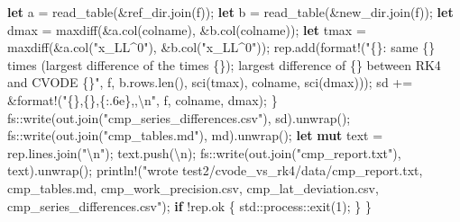 \documentclass[
  10pt,
]{article}
\newenvironment{Shaded}{}{}
\newcommand{\CharTok}[1]{\textcolor[rgb]{0.25,0.44,0.63}{#1}}
\newcommand{\ControlFlowTok}[1]{\textcolor[rgb]{0.00,0.44,0.13}{\textbf{#1}}}
\newcommand{\DecValTok}[1]{\textcolor[rgb]{0.25,0.63,0.44}{#1}}
\newcommand{\KeywordTok}[1]{\textcolor[rgb]{0.00,0.44,0.13}{\textbf{#1}}}
\newcommand{\NormalTok}[1]{#1}
\newcommand{\OperatorTok}[1]{\textcolor[rgb]{0.40,0.40,0.40}{#1}}
\newcommand{\PreprocessorTok}[1]{\textcolor[rgb]{0.74,0.48,0.00}{#1}}
\newcommand{\SpecialCharTok}[1]{\textcolor[rgb]{0.25,0.44,0.63}{#1}}
\newcommand{\StringTok}[1]{\textcolor[rgb]{0.25,0.44,0.63}{#1}}
\begin{document}
\begin{Shaded}
\begin{Highlighting}[]
        \KeywordTok{let}\NormalTok{ a }\OperatorTok{=}\NormalTok{ read\_table(}\OperatorTok{\&}\NormalTok{ref\_dir}\OperatorTok{.}\NormalTok{join(f))}\OperatorTok{;}
        \KeywordTok{let}\NormalTok{ b }\OperatorTok{=}\NormalTok{ read\_table(}\OperatorTok{\&}\NormalTok{new\_dir}\OperatorTok{.}\NormalTok{join(f))}\OperatorTok{;}
        \KeywordTok{let}\NormalTok{ dmax }\OperatorTok{=}\NormalTok{ maxdiff(}\OperatorTok{\&}\NormalTok{a}\OperatorTok{.}\NormalTok{col(colname)}\OperatorTok{,} \OperatorTok{\&}\NormalTok{b}\OperatorTok{.}\NormalTok{col(colname))}\OperatorTok{;}
        \KeywordTok{let}\NormalTok{ tmax }\OperatorTok{=}\NormalTok{ maxdiff(}\OperatorTok{\&}\NormalTok{a}\OperatorTok{.}\NormalTok{col(}\StringTok{"x\_LL\^{}0"}\NormalTok{)}\OperatorTok{,} \OperatorTok{\&}\NormalTok{b}\OperatorTok{.}\NormalTok{col(}\StringTok{"x\_LL\^{}0"}\NormalTok{))}\OperatorTok{;}
\NormalTok{        rep}\OperatorTok{.}\NormalTok{add(}\PreprocessorTok{format!}\NormalTok{(}\StringTok{"\{\}: same \{\} times (largest difference of the times \{\}); largest difference of \{\} between RK4 and CVODE \{\}"}\OperatorTok{,}\NormalTok{ f}\OperatorTok{,}\NormalTok{ b}\OperatorTok{.}\NormalTok{rows}\OperatorTok{.}\NormalTok{len()}\OperatorTok{,}\NormalTok{ sci(tmax)}\OperatorTok{,}\NormalTok{ colname}\OperatorTok{,}\NormalTok{ sci(dmax)))}\OperatorTok{;}
\NormalTok{        sd }\OperatorTok{+=} \OperatorTok{\&}\PreprocessorTok{format!}\NormalTok{(}\StringTok{"\{\},\{\},\{:.6e\},,}\SpecialCharTok{\textbackslash{}n}\StringTok{"}\OperatorTok{,}\NormalTok{ f}\OperatorTok{,}\NormalTok{ colname}\OperatorTok{,}\NormalTok{ dmax)}\OperatorTok{;}
    \OperatorTok{\}}
    \PreprocessorTok{fs::}\NormalTok{write(out}\OperatorTok{.}\NormalTok{join(}\StringTok{"cmp\_series\_differences.csv"}\NormalTok{)}\OperatorTok{,}\NormalTok{ sd)}\OperatorTok{.}\NormalTok{unwrap()}\OperatorTok{;}
    \PreprocessorTok{fs::}\NormalTok{write(out}\OperatorTok{.}\NormalTok{join(}\StringTok{"cmp\_tables.md"}\NormalTok{)}\OperatorTok{,}\NormalTok{ md)}\OperatorTok{.}\NormalTok{unwrap()}\OperatorTok{;}
    \KeywordTok{let} \KeywordTok{mut}\NormalTok{ text }\OperatorTok{=}\NormalTok{ rep}\OperatorTok{.}\NormalTok{lines}\OperatorTok{.}\NormalTok{join(}\StringTok{"}\SpecialCharTok{\textbackslash{}n}\StringTok{"}\NormalTok{)}\OperatorTok{;}
\NormalTok{    text}\OperatorTok{.}\NormalTok{push(}\CharTok{\textquotesingle{}}\SpecialCharTok{\textbackslash{}n}\CharTok{\textquotesingle{}}\NormalTok{)}\OperatorTok{;}
    \PreprocessorTok{fs::}\NormalTok{write(out}\OperatorTok{.}\NormalTok{join(}\StringTok{"cmp\_report.txt"}\NormalTok{)}\OperatorTok{,}\NormalTok{ text)}\OperatorTok{.}\NormalTok{unwrap()}\OperatorTok{;}
    \PreprocessorTok{println!}\NormalTok{(}\StringTok{"wrote test2/cvode\_vs\_rk4/data/cmp\_report.txt, cmp\_tables.md, cmp\_work\_precision.csv, cmp\_lat\_deviation.csv, cmp\_series\_differences.csv"}\NormalTok{)}\OperatorTok{;}
    \ControlFlowTok{if} \OperatorTok{!}\NormalTok{rep}\OperatorTok{.}\NormalTok{ok }\OperatorTok{\{}
        \PreprocessorTok{std::process::}\NormalTok{exit(}\DecValTok{1}\NormalTok{)}\OperatorTok{;}
    \OperatorTok{\}}
\OperatorTok{\}}
\end{Highlighting}
\end{Shaded}
\end{document}
